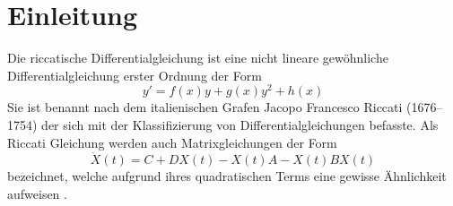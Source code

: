 \section{Einleitung} \label{kra:section:einleitung}
Die riccatische Differentialgleichung ist eine nicht lineare gewöhnliche Differentialgleichung erster Ordnung der Form
\begin{equation}
    \label{kra:equation:riccati}
    y' = f(x)y + g(x)y^2 + h(x)
\end{equation}
Sie ist benannt nach dem italienischen Grafen Jacopo Francesco Riccati (1676–1754) der sich mit der Klassifizierung von Differentialgleichungen befasste.
Als Riccati Gleichung werden auch Matrixgleichungen der Form
\begin{equation}
    \label{kra:equation:matrixriccati}
    \dot{X}(t) = C + DX(t) - X(t)A -X(t)BX(t)
\end{equation}
bezeichnet, welche aufgrund ihres quadratischen Terms eine gewisse Ähnlichkeit aufweisen \cite{kra:riccati} \cite{kra:ethz}.

